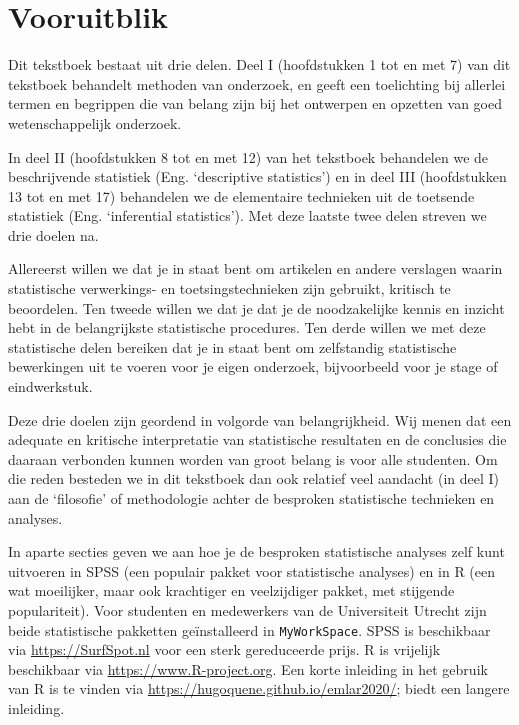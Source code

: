 \documentclass[
]{book}
\begin{document}
\hypertarget{vooruitblik}{%
\section{Vooruitblik}\label{vooruitblik}}

Dit tekstboek bestaat uit drie delen. Deel I (hoofdstukken 1 tot en met 7) van dit tekstboek behandelt
methoden van onderzoek, en geeft een toelichting bij allerlei termen en
begrippen die van belang zijn bij het ontwerpen en opzetten van goed
wetenschappelijk onderzoek.

In deel II (hoofdstukken 8 tot en met 12) van het tekstboek behandelen we de beschrijvende statistiek
(Eng. `descriptive statistics') en in deel III (hoofdstukken 13 tot en met 17) behandelen we de
elementaire technieken uit de toetsende statistiek (Eng. `inferential
statistics'). Met deze laatste twee delen streven we drie doelen na.

Allereerst willen we dat je in staat bent om artikelen en andere verslagen waarin
statistische verwerkings- en toetsingstechnieken zijn gebruikt, kritisch
te beoordelen.
Ten tweede willen we dat je dat je de noodzakelijke
kennis en inzicht hebt in de belangrijkste statistische procedures.
Ten derde willen we met deze statistische delen bereiken dat je in staat
bent om zelfstandig statistische bewerkingen uit te voeren voor je eigen
onderzoek, bijvoorbeeld voor je stage of eindwerkstuk.

Deze drie doelen zijn geordend in volgorde van belangrijkheid. Wij menen
dat een adequate en kritische interpretatie van statistische resultaten
en de conclusies die daaraan verbonden kunnen worden van groot belang is
voor alle studenten. Om die reden besteden we in dit tekstboek dan ook
relatief veel aandacht (in deel I) aan de `filosofie' of methodologie achter de besproken statistische technieken en analyses.

In aparte secties geven we
aan hoe je de besproken statistische analyses zelf kunt uitvoeren in
SPSS (een populair pakket voor statistische analyses) en in R (een wat
moeilijker, maar ook krachtiger en veelzijdiger pakket, met stijgende
populariteit).
Voor studenten en medewerkers van de Universiteit Utrecht zijn beide statistische pakketten geïnstalleerd in \texttt{MyWorkSpace}. SPSS is beschikbaar via \url{https://SurfSpot.nl} voor een sterk gereduceerde prijs. R is vrijelijk beschikbaar via \url{https://www.R-project.org}. Een korte inleiding in het gebruik van R is te vinden via \url{https://hugoquene.github.io/emlar2020/}; \citet{Dalg02} biedt een langere inleiding.
\end{document}
